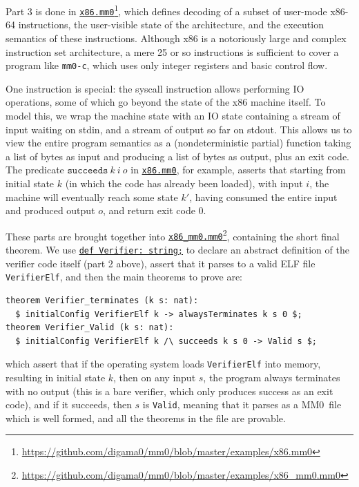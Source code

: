\documentclass[runningheads]{llncs}
\newcommand{\mmO}{\textsf{MM0}}
\begin{document}
Part 3 is done in \href{https://github.com/digama0/mm0/blob/master/examples/x86.mm0}{\texttt{x86.mm0}}\footnote{
  \url{https://github.com/digama0/mm0/blob/master/examples/x86.mm0}
}, which defines decoding of a subset of user-mode x86-64 instructions, the user-visible state of the architecture, and the execution semantics of these instructions. Although x86 is a notoriously large and complex instruction set architecture, a mere 25 or so instructions is sufficient to cover a program like \texttt{mm0-c}, which uses only integer registers and basic control flow.

One instruction is special: the \textsf{syscall} instruction allows performing IO operations, some of which go beyond the state of the x86 machine itself. To model this, we wrap the machine state with an IO state containing a stream of input waiting on \textsf{stdin}, and a stream of output so far on \textsf{stdout}. This allows us to view the entire program semantics as a (nondeterministic partial) function taking a list of bytes as input and producing a list of bytes as output, plus an exit code. The predicate \href{https://github.com/digama0/mm0/blob/775e6dd/examples/x86.mm0#L1230-L1236}{$\mathtt{succeeds}\ k\ i\ o$} in \href{https://github.com/digama0/mm0/blob/master/examples/x86.mm0}{\texttt{x86.mm0}}, for example, asserts that starting from initial state $k$ (in which the code has already been loaded), with input $i$, the machine will eventually reach some state $k'$, having consumed the entire input and produced output $o$, and return exit code $0$.

These parts are brought together into \href{https://github.com/digama0/mm0/blob/master/examples/x86_mm0.mm0}{\texttt{x86\_mm0.mm0}}\footnote{
  \url{https://github.com/digama0/mm0/blob/master/examples/x86_mm0.mm0}
}, containing the short final theorem. We use \href{https://github.com/digama0/mm0/blob/master/examples/x86_mm0.mm0#L9}{\texttt{def Verifier: string;}} to declare an abstract definition of the verifier code itself (part 2 above), assert that it parses to a valid ELF file \texttt{VerifierElf}, and then the main theorems to prove are:
\begin{verbatim}
theorem Verifier_terminates (k s: nat):
  $ initialConfig VerifierElf k -> alwaysTerminates k s 0 $;
theorem Verifier_Valid (k s: nat):
  $ initialConfig VerifierElf k /\ succeeds k s 0 -> Valid s $;
\end{verbatim}
which assert that if the operating system loads \texttt{VerifierElf} into memory, resulting in initial state $k$, then on any input $s$, the program always terminates with no output (this is a bare verifier, which only produces success as an exit code), and if it succeeds, then $s$ is \texttt{Valid}, meaning that it parses as a \mmO\ file which is well formed, and all the theorems in the file are provable.
\end{document}
